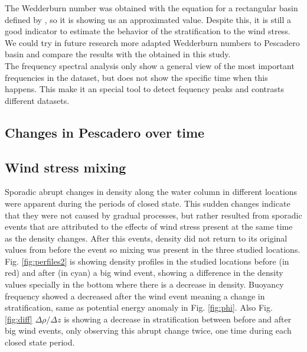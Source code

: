 \documentclass[tesis.tex]{subfiles}
\begin{document}
The Wedderburn number was obtained with the equation for a rectangular basin defined by \cite{Monismith1985}, so it is showing us an approximated value. Despite this, it is still a good indicator to estimate the behavior of the stratification to the wind stress. We could try in future research more adapted Wedderburn numbers to Pescadero basin and compare the results with the obtained in this study.\\

The frequency spectral analysis only show a general view of the most important frequencies in the dataset, but does not show the specific time when this happens. This make it an special tool to detect fequency peaks and contrasts different datasets.\\

\subsection{Changes in Pescadero over time}

\subsection{Wind stress mixing}

Sporadic abrupt changes in density along the water column in different locations were apparent during the periods of closed state. This sudden changes indicate that they were not caused by gradual processes, but rather resulted from sporadic events that are attributed to the effects of wind stress present at the same time as the density changes. After this events, density did not return to its original values from before the event so mixing was present in the three studied locations.\\

Fig. \ref{fig:perfiles2} is showing density profiles in the studied locations before (in red) and after (in cyan) a big wind event, showing a difference in the density values specially in the bottom where there is a decrease in density. Buoyancy frequency showed a decreased after the wind event meaning a change in stratification, same as potential energy anomaly in Fig. \ref{fig:phi}. Also Fig. \ref{fig:diff} $\Delta \rho/\Delta z$ is showing a decrease in stratification between before and after big wind events, only observing this abrupt change twice, one time during each closed state period.\\
\end{document}
